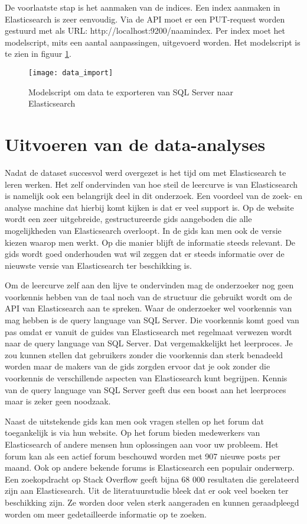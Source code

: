 De voorlaatste stap is het aanmaken van de indices. Een index aanmaken in Elasticsearch is zeer eenvoudig. Via de API moet er een PUT-request worden gestuurd met als URL: http://localhost:9200/naam\textunderscore index.
Per index moet het modelscript, mits een aantal aanpassingen, uitgevoerd worden. Het modelscript is te zien in figuur \ref{fig:data_import}.

\begin{figure}
	\centering
	\texttt{[image: data\_import]}
	\caption{Modelscript om data te exporteren van SQL Server naar Elasticsearch}
	\label{fig:data_import}
\end{figure}

\section{Uitvoeren van de data-analyses}
Nadat de dataset succesvol werd overgezet is het tijd om met Elasticsearch te leren werken. Het zelf ondervinden van hoe steil de leercurve is van Elasticsearch is namelijk ook een belangrijk deel in dit onderzoek. Een voordeel van de zoek- en analyse machine dat hierbij komt kijken is dat er veel support is. Op de website wordt een zeer uitgebreide, gestructureerde gids aangeboden die alle mogelijkheden van Elasticsearch overloopt. In de gids kan men ook de versie kiezen waarop men werkt. Op die manier blijft de informatie steeds relevant. De gids wordt goed onderhouden wat wil zeggen dat er steeds informatie over de nieuwste versie van Elasticsearch ter beschikking is. 

Om de leercurve zelf aan den lijve te ondervinden mag de onderzoeker nog geen voorkennis hebben van de taal noch van de structuur die gebruikt wordt om de API van Elasticsearch aan te spreken. Waar de onderzoeker wel voorkennis van mag hebben is de query language van SQL Server. Die voorkennis komt goed van pas omdat er vanuit de guides van Elasticsearch met regelmaat verwezen wordt naar de query language van SQL Server. Dat vergemakkelijkt het leerproces. Je zou kunnen stellen dat gebruikers zonder die voorkennis dan sterk benadeeld worden maar de makers van de gids zorgden ervoor dat je ook zonder die voorkennis de verschillende aspecten van Elasticsearch kunt begrijpen. Kennis van de query language van SQL Server geeft dus een boost aan het leerproces maar is zeker geen noodzaak.

Naast de uitstekende gids kan men ook vragen stellen op het forum dat toegankelijk is via hun website. Op het forum bieden medewerkers van Elasticsearch of andere mensen hun oplossingen aan voor uw probleem. Het forum kan als een actief forum beschouwd worden met 907 nieuwe posts per maand. Ook op andere bekende forums is Elasticsearch een populair onderwerp. Een zoekopdracht op Stack Overflow geeft bijna 68 000 resultaten die gerelateerd zijn aan Elasticsearch. Uit de literatuurstudie bleek dat er ook veel boeken ter beschikking zijn. Ze worden door velen sterk aangeraden en kunnen geraadpleegd worden om meer gedetailleerde informatie op te zoeken. 


